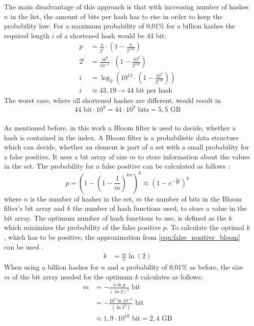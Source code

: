 The main disadvantage of this approach is that with increasing number of hashes $n$ in the list, the amount of bits per hash has to rise in order to keep the probability low.
For a maximum probability of 0,01\% for a billion hashes the required length $i$ of a shortened hash would be 44 bit:
\begin{equation}
	\begin{split}
		p&=\frac{n}{2^i}\cdot \left(1- \frac{n}{2^{128}}\right) \\[10pt]
		2^i&=\frac{10^9}{10^{-4}}\cdot \left(1- \frac{10^9}{2^{128}}\right) \\[10pt]
		i&=\log_2\left(10^{13}\cdot \left(1- \frac{10^9}{2^{128}}\right)\right) \\[10pt]
		i&\approx 43,19 \rightarrow 44 \text{ bit per hash}
	\end{split}
\end{equation}
The worst case, where all shortened hashes are different, would result in 
\begin{equation}
	44\text{ bit} \cdot 10^9 = 44\cdot10^9 \text{ bits} = 5,5 \text{ GB}
\end{equation}
\\
As mentioned before, in this work a Bloom filter is used to decide, whether a hash is contained in the index.
A Bloom filter is a probabilistic data structure which can decide, whether an element is part of a set with a small probability for a false positive.
It uses a bit array of size $m$ to store information about the values in the set.
The probability for a false positive can be calculated as follows \cite{fan2000summary}:
\begin{equation}\label{equ:false_positive_bloom}
	p=\left(1-\left(1-\frac{1}{m}\right)^{kn}\right)^k \approx \left(1-e^{-\frac{kn}{m}}\right)^k
\end{equation}
where $n$ is the number of hashes in the set, $m$ the number of bits in the Bloom filter's bit array and $k$ the number of hash functions used, to store a value in the bit array.
The optimum number of hash functions to use, is defined as the $k$ which minimizes the probability of the false positive $p$.
To calculate the optimal $k$, which has to be positive, the approximation from \autoref{equ:false_positive_bloom} can be used \cite{wiki2018bloom}.
\begin{equation}
	\begin{split}
		k&=\frac{m}{n}\ln(2)
	\end{split}
\end{equation}
When using a billion hashes for $n$ and a probability of 0,01\% as before, the size $m$ of the bit array needed for the optimum $k$ calculates as follows:
\begin{equation}
	\begin{split}
		m&=-\frac{n\ln p}{(\ln2)^2} \text{ bit} \\[10pt]
		&=-\frac{10^9\ln10^{-4}}{(\ln2^2)} \text{ bit} \\[10pt]
		&\approx 1,9\cdot10^{10} \text{ bit}=2,4\text{ GB}
	\end{split}
\end{equation}

